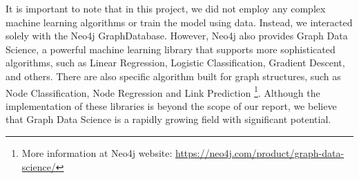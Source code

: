\documentclass{article}
\begin{document}
It is important to note that in this project, we did not employ any complex machine learning algorithms or train the model using data. Instead, we interacted solely with the Neo4j GraphDatabase. However, Neo4j also provides Graph Data Science, a powerful machine learning library that supports more sophisticated algorithms, such as Linear Regression, Logistic Classification, Gradient Descent, and others. There are also specific algorithm built for graph structures, such as Node Classification, Node Regression and Link Prediction \footnote{More information at Neo4j website: \href{https://neo4j.com/product/graph-data-science/}{https://neo4j.com/product/graph-data-science/}}. Although the implementation of these libraries is beyond the scope of our report, we believe that Graph Data Science is a rapidly growing field with significant potential.

% 
% 
\end{document}
